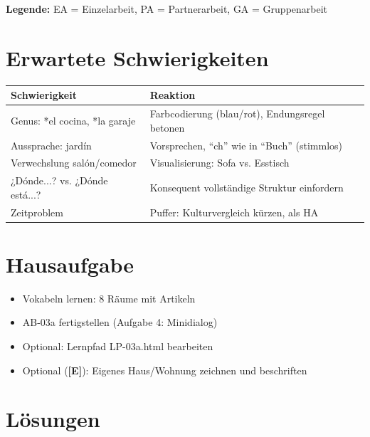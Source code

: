 \documentclass[11pt,a4paper]{article}
\newcommand{\E}{\textcolor{erweiterung}{\textbf{[E]}}}
\begin{document}
\textbf{Legende:} EA = Einzelarbeit, PA = Partnerarbeit, GA = Gruppenarbeit

\section{Erwartete Schwierigkeiten}

\begin{tabular}{|p{4.5cm}|p{8cm}|}
\hline
\textbf{Schwierigkeit} & \textbf{Reaktion} \\
\hline
Genus: *el cocina, *la garaje & Farbcodierung (blau/rot), Endungsregel betonen \\
\hline
Aussprache: jardín & Vorsprechen, ``ch'' wie in ``Buch'' (stimmlos) \\
\hline
Verwechslung salón/comedor & Visualisierung: Sofa vs. Esstisch \\
\hline
¿Dónde...? vs. ¿Dónde está...? & Konsequent vollständige Struktur einfordern \\
\hline
Zeitproblem & Puffer: Kulturvergleich kürzen, als HA \\
\hline
\end{tabular}

\section{Hausaufgabe}

\begin{itemize}
    \item Vokabeln lernen: 8 Räume mit Artikeln
    \item AB-03a fertigstellen (Aufgabe 4: Minidialog)
    \item Optional: Lernpfad LP-03a.html bearbeiten
    \item Optional (\E{}): Eigenes Haus/Wohnung zeichnen und beschriften
\end{itemize}

\section{Lösungen}
\end{document}
